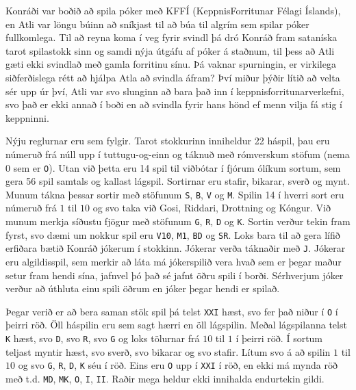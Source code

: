 
Konráði var boðið að spila póker með KFFÍ (KeppnisForritunar Félagi Íslands), en Atli var löngu búinn að sníkjast til að búa til
algrím sem spilar póker fullkomlega. Til að reyna koma í veg fyrir svindl þá dró Konráð fram sataníska tarot spilastokk sinn og
samdi nýja útgáfu af póker á staðnum, til þess að Atli gæti ekki svindlað með gamla forritinu sínu. Þá vaknar spurningin, er
virkilega siðferðislega rétt að hjálpa Atla að svindla áfram? Því miður þýðir lítið að velta sér upp úr því, Atli var svo
slunginn að bara það inn í keppnisforritunarverkefni, svo það er ekki annað í boði en að svindla fyrir hans hönd ef menn vilja
fá stig í keppninni.

Nýju reglurnar eru sem fylgir. Tarot stokkurinn inniheldur 22 háspil, þau eru númeruð frá núll upp í tuttugu-og-einn og táknuð
með rómverskum stöfum (nema $0$ sem er \texttt{O}). Utan við þetta eru 14 spil til viðbótar í fjórum ólíkum sortum, sem gera
56 spil samtals og kallast lágspil. Sortirnar eru stafir, bikarar, sverð og mynt. Munum tákna þessar sortir með stöfunum \texttt{S}, \texttt{B},
\texttt{V} og \texttt{M}. Spilin 14 í hverri sort eru númeruð frá $1$ til $10$ og svo taka við Gosi, Riddari, Drottning og Kóngur. Við munum merkja
síðustu fjögur með stöfunum \texttt{G}, \texttt{R}, \texttt{D} og \texttt{K}. Sortin verður tekin fram fyrst, svo dæmi um
nokkur spil eru \texttt{V10}, \texttt{M1}, \texttt{BD} og \texttt{SR}. Loks bara til að gera lífið erfiðara bætið Konráð
jókerum í stokkinn. Jókerar verða táknaðir með \texttt{J}. Jókerar eru algildisspil, sem merkir að láta má jókerspilið vera
hvað sem er þegar maður setur fram hendi sína, jafnvel þó það sé jafnt öðru spili í borði. Sérhverjum jóker verður að úthluta
einu spili öðrum en jóker þegar hendi er spilað.

Þegar verið er að bera saman stök spil þá telst \texttt{XXI} hæst, svo fer það niður í \texttt{O} í þeirri röð. Öll háspilin
eru sem sagt hærri en öll lágspilin. Meðal lágspilanna telst \texttt{K} hæst, svo \texttt{D}, svo \texttt{R}, svo \texttt{G} og
loks tölurnar frá $10$ til $1$ í þeirri röð. Í sortum teljast myntir hæst, svo sverð, svo bikarar og svo stafir. Lítum svo á
að spilin $1$ til $10$ og svo \texttt{G}, \texttt{R}, \texttt{D}, \texttt{K} séu í röð. Eins eru \texttt{O} upp í \texttt{XXI}
í röð, en ekki má mynda röð með t.d. \texttt{MD}, \texttt{MK}, \texttt{O}, \texttt{I}, \texttt{II}. Raðir mega heldur ekki
innihalda endurtekin gildi.


